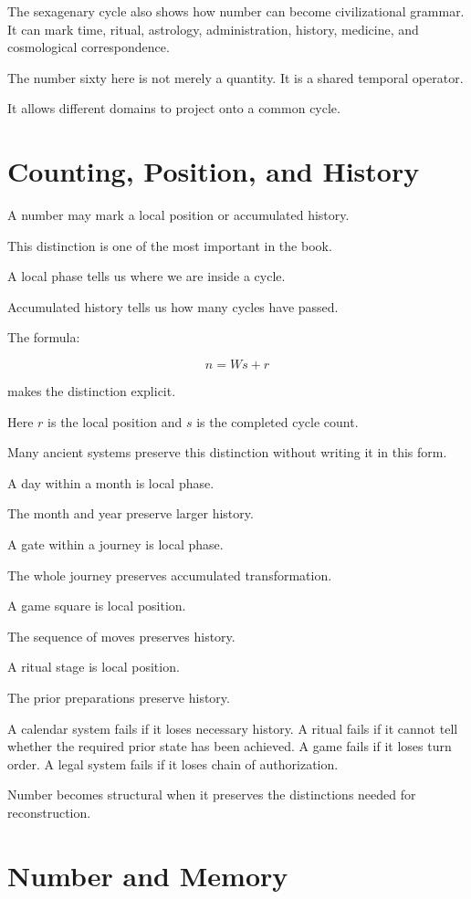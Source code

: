 \documentclass[11pt]{book}
\begin{document}
The sexagenary cycle also shows how number can become civilizational grammar. It can mark time, ritual, astrology, administration, history, medicine, and cosmological correspondence.

The number sixty here is not merely a quantity. It is a shared temporal operator.

It allows different domains to project onto a common cycle.

\section{Counting, Position, and History}

A number may mark a local position or accumulated history.

This distinction is one of the most important in the book.

A local phase tells us where we are inside a cycle.

Accumulated history tells us how many cycles have passed.

The formula:

\[
n = Ws + r
\]

makes the distinction explicit.

Here \(r\) is the local position and \(s\) is the completed cycle count.

Many ancient systems preserve this distinction without writing it in this form.

A day within a month is local phase.

The month and year preserve larger history.

A gate within a journey is local phase.

The whole journey preserves accumulated transformation.

A game square is local position.

The sequence of moves preserves history.

A ritual stage is local position.

The prior preparations preserve history.

A calendar system fails if it loses necessary history. A ritual fails if it cannot tell whether the required prior state has been achieved. A game fails if it loses turn order. A legal system fails if it loses chain of authorization.

Number becomes structural when it preserves the distinctions needed for reconstruction.

\section{Number and Memory}
\end{document}
